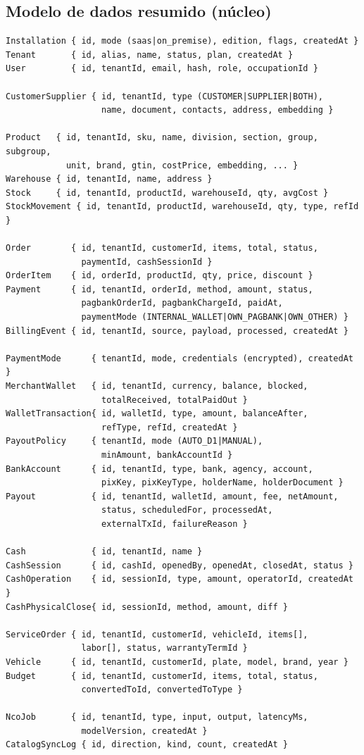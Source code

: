 \documentclass[11pt,a4paper]{article}
\begin{document}
\subsection{Modelo de dados resumido (núcleo)}

\begin{lstlisting}
Installation { id, mode (saas|on_premise), edition, flags, createdAt }
Tenant       { id, alias, name, status, plan, createdAt }
User         { id, tenantId, email, hash, role, occupationId }

CustomerSupplier { id, tenantId, type (CUSTOMER|SUPPLIER|BOTH),
                   name, document, contacts, address, embedding }

Product   { id, tenantId, sku, name, division, section, group, subgroup,
            unit, brand, gtin, costPrice, embedding, ... }
Warehouse { id, tenantId, name, address }
Stock     { id, tenantId, productId, warehouseId, qty, avgCost }
StockMovement { id, tenantId, productId, warehouseId, qty, type, refId }

Order        { id, tenantId, customerId, items, total, status,
               paymentId, cashSessionId }
OrderItem    { id, orderId, productId, qty, price, discount }
Payment      { id, tenantId, orderId, method, amount, status,
               pagbankOrderId, pagbankChargeId, paidAt,
               paymentMode (INTERNAL_WALLET|OWN_PAGBANK|OWN_OTHER) }
BillingEvent { id, tenantId, source, payload, processed, createdAt }

PaymentMode      { tenantId, mode, credentials (encrypted), createdAt }
MerchantWallet   { id, tenantId, currency, balance, blocked,
                   totalReceived, totalPaidOut }
WalletTransaction{ id, walletId, type, amount, balanceAfter,
                   refType, refId, createdAt }
PayoutPolicy     { tenantId, mode (AUTO_D1|MANUAL),
                   minAmount, bankAccountId }
BankAccount      { id, tenantId, type, bank, agency, account,
                   pixKey, pixKeyType, holderName, holderDocument }
Payout           { id, tenantId, walletId, amount, fee, netAmount,
                   status, scheduledFor, processedAt,
                   externalTxId, failureReason }

Cash             { id, tenantId, name }
CashSession      { id, cashId, openedBy, openedAt, closedAt, status }
CashOperation    { id, sessionId, type, amount, operatorId, createdAt }
CashPhysicalClose{ id, sessionId, method, amount, diff }

ServiceOrder { id, tenantId, customerId, vehicleId, items[],
               labor[], status, warrantyTermId }
Vehicle      { id, tenantId, customerId, plate, model, brand, year }
Budget       { id, tenantId, customerId, items, total, status,
               convertedToId, convertedToType }

NcoJob       { id, tenantId, type, input, output, latencyMs,
               modelVersion, createdAt }
CatalogSyncLog { id, direction, kind, count, createdAt }
\end{lstlisting}
\end{document}
